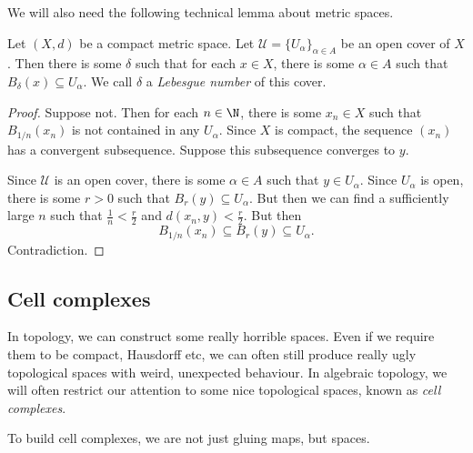 \documentclass[a4paper]{article}
\begin{document}
We will also need the following technical lemma about metric spaces.

\begin{lemma}
  Let $(X, d)$ be a compact metric space. Let $\mathcal{U} = \{U_\alpha\}_{\alpha \in A}$ be an open cover of $X$. Then there is some $\delta$ such that for each $x \in X$, there is some $\alpha \in A$ such that $B_\delta(x) \subseteq U_\alpha$. We call $\delta$ a \emph{Lebesgue number} of this cover.
\end{lemma}

\begin{proof}
  Suppose not. Then for each $n \in \N$, there is some $x_n \in X$ such that $B_{1/n} (x_n)$ is not contained in any $U_\alpha$. Since $X$ is compact, the sequence $(x_n)$ has a convergent subsequence. Suppose this subsequence converges to $y$.

  Since $\mathcal{U}$ is an open cover, there is some $\alpha \in A$ such that $y \in U_\alpha$. Since $U_\alpha$ is open, there is some $r > 0$ such that $B_r(y) \subseteq U_\alpha$. But then we can find a sufficiently large $n$ such that $\frac{1}{n} < \frac{r}{2}$ and $d(x_n, y) < \frac{r}{2}$. But then
  \[
    B_{1/n}(x_n) \subseteq B_r(y) \subseteq U_\alpha.
  \]
  Contradiction.
\end{proof}

\subsection{Cell complexes}
In topology, we can construct some really horrible spaces. Even if we require them to be compact, Hausdorff etc, we can often still produce really ugly topological spaces with weird, unexpected behaviour. In algebraic topology, we will often restrict our attention to some nice topological spaces, known as \emph{cell complexes}.

To build cell complexes, we are not just gluing maps, but spaces.
\end{document}
